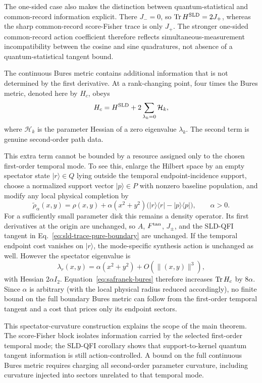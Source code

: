 The one-sided case also makes the distinction between quantum-statistical and common-record information explicit. There $J_-=0$, so $\operatorname{Tr} H^{\rm SLD}=2J_+$, whereas the sharp common-record score-Fisher trace is only $J_+$. The stronger one-sided common-record action coefficient therefore reflects simultaneous-measurement incompatibility between the cosine and sine quadratures, not absence of a quantum-statistical tangent bound.

The continuous Bures metric contains additional information that is not determined by the first derivative. At a rank-changing point, four times the Bures metric, denoted here by $H_c$, obeys \cite{Safranek2017}
\begin{equation}
H_c=H^{\rm SLD}+2\sum_{\lambda_k=0}\mathcal H_k,
\label{eq:safranek-bures}
\end{equation}
where $\mathcal H_k$ is the parameter Hessian of a zero eigenvalue $\lambda_k$. The second term is genuine second-order path data.

This extra term cannot be bounded by a resource assigned only to the chosen first-order temporal mode. To see this, enlarge the Hilbert space by an empty spectator state $|r\rangle\in Q$ lying outside the temporal endpoint-incidence support, choose a normalized support vector $|p\rangle\in P$ with nonzero baseline population, and modify any local physical completion by
\begin{equation}
\widetilde\rho_\alpha(x,y)
=\rho(x,y)+\alpha(x^2+y^2)
\bigl(|r\rangle\!\langle r|-|p\rangle\!\langle p|\bigr),
\qquad \alpha>0.
\label{eq:spectator-curvature-family}
\end{equation}
For a sufficiently small parameter disk this remains a density operator. Its first derivatives at the origin are unchanged, so $A$, $F^{\rm tan}$, $J_\pm$, and the SLD-QFI tangent in Eq.~\eqref{eq:sld-trace-pure-boundary} are unchanged. If the temporal endpoint cost vanishes on $|r\rangle$, the mode-specific synthesis action is unchanged as well. However the spectator eigenvalue is
\begin{equation}
\lambda_r(x,y)=\alpha(x^2+y^2)+O(\|(x,y)\|^3),
\end{equation}
with Hessian $2\alpha I_2$. Equation~\eqref{eq:safranek-bures} therefore increases $\operatorname{Tr} H_c$ by $8\alpha$. Since $\alpha$ is arbitrary (with the local physical radius reduced accordingly), no finite bound on the full boundary Bures metric can follow from the first-order temporal tangent and a cost that prices only its endpoint sectors.

This spectator-curvature construction explains the scope of the main theorem. The score-Fisher block isolates information carried by the selected first-order temporal mode; the SLD-QFI corollary shows that support-to-kernel quantum tangent information is still action-controlled. A bound on the full continuous Bures metric requires charging all second-order parameter curvature, including curvature injected into sectors unrelated to that temporal mode.

